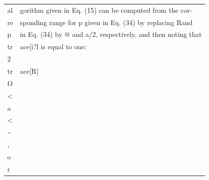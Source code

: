 {\begin{longtable}[]{@{}ll@{}}
al & gorithm given in Eq. (15) can be computed from the cor- \\
re & sponding range for p given in Eq. (34) by replacing Rand \\
p & in Eq. (34) by @ and a/2, respectively, and then noting that \\
tr & ace{[}i?l is equal to one: \\
2 & \\
tr & ace{[}R{]} \\
O & \\
\textless{} & \\
a & \\
\textless{} & \\
\textasciitilde{} & \\
, & \\
o & \\
r & \\
\end{longtable}
}

